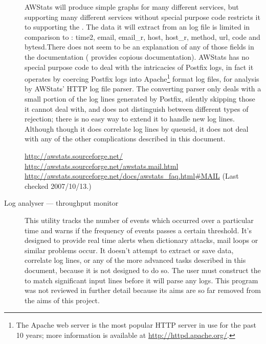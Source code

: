 \documentclass[a4paper,12pt,draft]{article}
\newcommand{\parsername}{\PLP{}}
\newcommand{\tab}[0]{%
    \hspace*{2em}%
}
\begin{document}
\begin{description}
        AWStats will produce simple graphs for many different services, but
        supporting many different services without special purpose code
        restricts it to supporting the \LCD{}.  The data it will extract
        from an \MTA{} log file is limited in comparison to \parsername{}:
        \newline \tab{} time2, email, email\_r, host, host\_r, method, url,
        code and bytesd.\newline  There does not seem to be an explanation
        of any of those fields in the documentation (\parsername{} provides
        copious documentation).  AWStats has no special purpose code to
        deal with the intricacies of Postfix logs, in fact it operates by
        coercing Postfix logs into Apache\footnote{The Apache web server is
        the most popular HTTP server in use for the past 10 years; more
        information is available at \url{http://httpd.apache.org/}.} format
        log files, for analysis by AWStats' HTTP log file parser.  The
        converting parser only deals with a small portion of the log lines
        generated by Postfix, silently skipping those it cannot deal with,
        and does not distinguish between different types of rejection;
        there is no easy way to extend it to handle new log lines.
        Although though it does correlate log lines by queueid, it does not
        deal with any of the other complications described in this
        document.

        \url{http://awstats.sourceforge.net/} \newline
        \url{http://awstats.sourceforge.net/awstats.mail.html} \newline
        \url{http://awstats.sourceforge.net/docs/awstats_faq.html#MAIL}
        \newline (Last checked 2007/10/13.)

    \item [Log analyser --- throughput monitor] This utility tracks the
        number of events which occurred over a particular time and warns if
        the frequency of events passes a certain threshold.  It's designed
        to provide real time alerts when dictionary attacks, mail loops or
        similar problems occur. It doesn't attempt to extract or save data,
        correlate log lines, or any of the more advanced tasks described in
        this document, because it is not designed to do so.  The user must
        construct the \regexes{} to match significant input lines before it
        will parse any logs.  This program was not reviewed in further
        detail because its aims are so far removed from the aims of this
        project.


\end{description}
\end{document}
